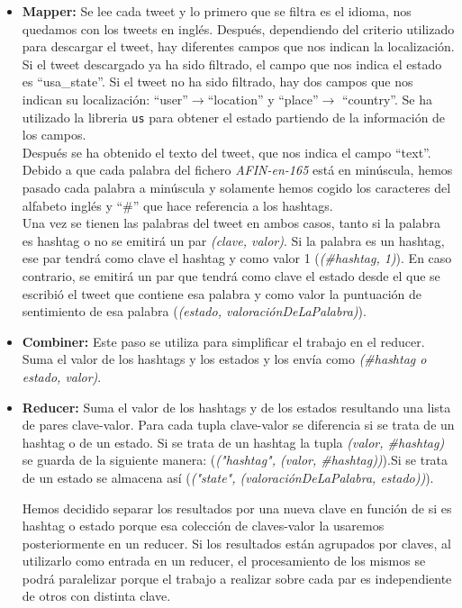 \documentclass[12pt,a4paper]{article}
\begin{document}
\begin{itemize}
\item \textbf{Mapper:} Se lee cada tweet y lo primero que se filtra es el idioma, nos quedamos con los tweets en inglés. Después, dependiendo del criterio utilizado para descargar el tweet, hay diferentes campos que nos indican la localización. Si el tweet descargado ya ha sido filtrado, el campo que nos indica el estado es ``usa\_state''. Si el tweet no ha sido filtrado, hay dos campos que nos indican su localización: ``user''$\rightarrow$``location'' y ``place''$\rightarrow$ ``country''. Se ha utilizado la libreria \texttt{us} para obtener el estado partiendo de la información de los campos.\\

Después se ha obtenido el texto del tweet, que nos indica el campo ``text''. Debido a que cada palabra del fichero \textit{AFIN-en-165} está en minúscula, hemos pasado cada palabra a minúscula y solamente hemos cogido los caracteres del alfabeto inglés y ``\#'' que hace referencia a los hashtags.\\

Una vez se tienen las palabras del tweet en ambos casos, tanto si la palabra es hashtag o no se emitirá un par \textit{(clave, valor)}. Si la palabra es un hashtag, ese par tendrá como clave el hashtag y como valor 1 (\textit{(\#hashtag, 1)}). En caso contrario, se emitirá un par que tendrá como clave el estado desde el que se escribió el tweet que contiene esa palabra y como valor la puntuación de sentimiento de esa palabra (\textit{(estado, valoraciónDeLaPalabra)}).

\item \textbf{Combiner:} Este paso se utiliza para simplificar el trabajo en el reducer. Suma el valor de los hashtags y los estados y los envía como \textit{(\#hashtag o estado, valor)}.

\item \textbf{Reducer:} Suma el valor de los hashtags y de los estados resultando una lista de pares clave-valor. Para cada tupla clave-valor se diferencia si se trata de un hashtag o de un estado. Si se trata de un hashtag la tupla \textit{(valor, \#hashtag)} se guarda de la siguiente manera: (\textit{("hashtag", (valor, \#hashtag))}).Si se trata de un estado se almacena así (\textit{("state", (valoraciónDeLaPalabra, estado))}).

Hemos decidido separar los resultados por una nueva clave en función de si es hashtag o estado porque esa colección de claves-valor la usaremos posteriormente en un reducer. Si los resultados están agrupados por claves, al utilizarlo como entrada en un reducer, el procesamiento de los mismos se podrá paralelizar porque el trabajo a realizar sobre cada par es independiente de otros con distinta clave.


\end{itemize}
\end{document}
